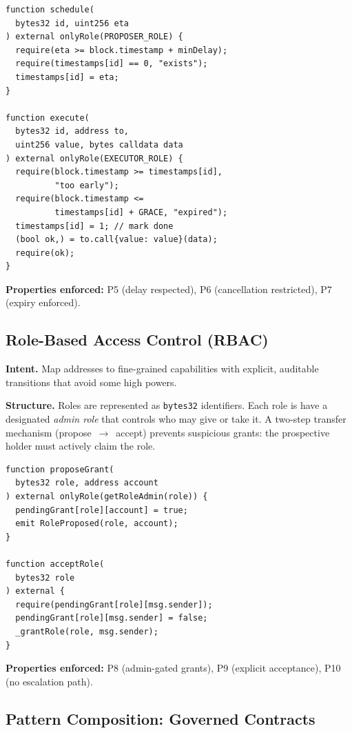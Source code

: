 \documentclass[conference]{IEEEtran}
\begin{document}
\begin{lstlisting}[float=!t, caption={Timelock schedule and run
  (simplified).}, label=lst:timelock]
function schedule(
  bytes32 id, uint256 eta
) external onlyRole(PROPOSER_ROLE) {
  require(eta >= block.timestamp + minDelay);
  require(timestamps[id] == 0, "exists");
  timestamps[id] = eta;
}

function execute(
  bytes32 id, address to,
  uint256 value, bytes calldata data
) external onlyRole(EXECUTOR_ROLE) {
  require(block.timestamp >= timestamps[id],
          "too early");
  require(block.timestamp <=
          timestamps[id] + GRACE, "expired");
  timestamps[id] = 1; // mark done
  (bool ok,) = to.call{value: value}(data);
  require(ok);
}
\end{lstlisting}

\textbf{Properties enforced:} P5 (delay respected), P6 (cancellation
restricted), P7 (expiry enforced).

\subsection{Role-Based Access Control (RBAC)}
\label{sec:rbac}

\textbf{Intent.}  Map addresses to fine-grained capabilities with
explicit, auditable transitions that avoid some high powers.

\textbf{Structure.}  Roles are represented as \texttt{bytes32}
identifiers.  Each role is have a designated \emph{admin role} that
controls who may give or take it.  A two-step transfer mechanism
(propose~$\to$~accept) prevents suspicious grants: the
prospective holder must actively claim the role.

\begin{lstlisting}[float=!t, caption={Two-step role grant (simplified).},
  label=lst:rbac]
function proposeGrant(
  bytes32 role, address account
) external onlyRole(getRoleAdmin(role)) {
  pendingGrant[role][account] = true;
  emit RoleProposed(role, account);
}

function acceptRole(
  bytes32 role
) external {
  require(pendingGrant[role][msg.sender]);
  pendingGrant[role][msg.sender] = false;
  _grantRole(role, msg.sender);
}
\end{lstlisting}

\textbf{Properties enforced:} P8 (admin-gated grants), P9 (explicit
acceptance), P10 (no escalation path).

\subsection{Pattern Composition: Governed Contracts}
\label{sec:composition}
\end{document}
